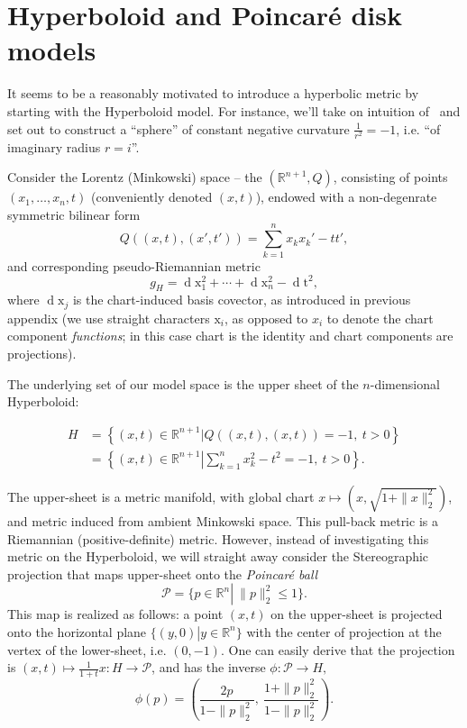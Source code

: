 \section{Hyperboloid and Poincar\'e disk models} \label{sec:poincareBall}

It seems to be a reasonably motivated to introduce a hyperbolic metric by
starting with the Hyperboloid model. For instance, we'll take on intuition
of~\cite{thurstonThree} and set out to construct a ``sphere'' of constant
negative curvature \( \frac{1}{r^2} = -1 \), i.e. ``of imaginary radius \( r=i
\)''.

Consider the Lorentz (Minkowski) space -- the \( (\mathbb{R}^{n+1}, Q) \),
consisting of points \( (x_1, \ldots, x_n, t) \) (conveniently denoted \( (x,
t) \)), endowed with a non-degenrate symmetric bilinear form
\[ Q((x, t), (x', t')) = \sum_{k=1}^n x_k x_k' - tt', \]
and corresponding pseudo-Riemannian metric \[ g_H = \operatorname{d}\mathrm{x}_1^2 +
\cdots + \operatorname{d}\mathrm{x}_n^2 - \operatorname{d}\mathrm{t}^2, \]
where \( \operatorname{d}\mathrm{x}_j \) is the chart-induced basis covector, as
introduced in previous appendix (we use straight characters \( \mathrm{x}_i \),
as opposed to \( x_i \) to denote the chart component \emph{functions}; in this
case chart is the identity and chart components are projections).

The underlying set of our model space is the upper sheet of the \(n\)-dimensional
Hyperboloid:

\begin{align*}
H &= \left\{ (x, t) \in \mathbb{R}^{n+1} \left| Q((x,t), (x,t)) = -1,~ t>0 \right.\right\}\\
&= \left\{ (x, t) \in \mathbb{R}^{n+1} \left| \sum_{k=1}^n x_k^2 - t^2 = -1,~t>0 \right.\right\}.
\end{align*}

The upper-sheet is a metric manifold, with global chart \( x \mapsto (x,
\sqrt{1 + \|x\|_2^2}) \), and metric induced from ambient Minkowski space. This
pull-back metric is a Riemannian (positive-definite) metric. However, instead
of investigating this metric on the Hyperboloid, we will straight away consider
the Stereographic projection that maps upper-sheet onto the \emph{Poincar\'e
ball} \[ \mathcal{P} = \{ p\in\mathbb{R}^n\left|~\|p\|_2^2 \leq 1\right.\}. \]
This map is realized as follows: a point \( (x, t) \) on the upper-sheet is
projected onto the horizontal plane \( \{ (y, 0) \left| y\in
\mathbb{R}^{n}\right. \} \) with the center of projection at the vertex of the
lower-sheet, i.e. \( (0, -1) \). One can easily derive that the projection is \(
(x, t) \mapsto \frac{1}{1+t}x: H\to\mathcal{P} \), and has the inverse \(
\phi:\mathcal{P}\to H, \) \[ \phi(p) = (\frac{2p}{1 -
\|p\|_2^2},~\frac{1+\|p\|_2^2}{1-\|p\|_2^2}). \]

